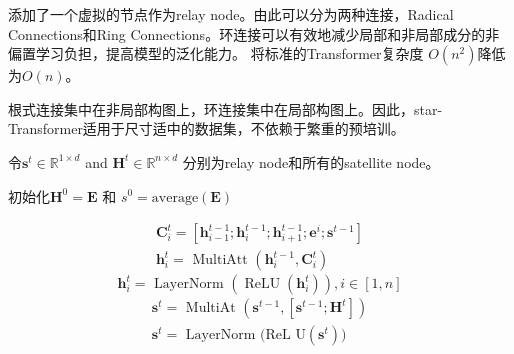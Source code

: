 \documentclass[a4paper,UTF8]{article}
\numberwithin{equation}{section}
\begin{document}
添加了一个虚拟的节点作为relay node。由此可以分为两种连接，Radical Connections和Ring Connections。环连接可以有效地减少局部和非局部成分的非偏置学习负担，提高模型的泛化能力。
将标准的Transformer复杂度 $O(n^2)$降低为$O(n)$。

根式连接集中在非局部构图上，环连接集中在局部构图上。因此，star-Transformer适用于尺寸适中的数据集，不依赖于繁重的预培训。

令$\mathbf{s}^{t} \in \mathbb{R}^{1 \times d}$ and $\mathbf{H}^{t} \in \mathbb{R}^{n \times d}$ 分别为relay node和所有的satellite node。

初始化$\mathbf{H}^{0}=\mathbf{E}$ 和 $s^0 = \text{average}(\mathbf{E})$

$$
\begin{array}{l}{\mathbf{C}_{i}^{t}=\left[\mathbf{h}_{i-1}^{t-1} ; \mathbf{h}_{i}^{t-1} ; \mathbf{h}_{i+1}^{t-1} ; \mathbf{e}^{i} ; \mathbf{s}^{t-1}\right]} \\ {\mathbf{h}_{i}^{t}=\text { MultiAtt }\left(\mathbf{h}_{i}^{t-1}, \mathbf{C}_{i}^{t}\right)}\end{array}
$$
$$
\mathbf{h}_{i}^{t}=\text { LayerNorm }\left(\operatorname{ReLU}\left(\mathbf{h}_{i}^{t}\right)\right), i \in[1, n]
$$
$$
\begin{array}{l}{\mathbf{s}^{t}=\text { MultiAt }\left(\mathbf{s}^{t-1},\left[\mathbf{s}^{t-1} ; \mathbf{H}^{t}\right]\right)} \\ {\mathbf{s}^{t}=\text { LayerNorm (ReL } \mathrm{U}\left(\mathbf{s}^{t}\right) )}\end{array}
$$
\end{document}
